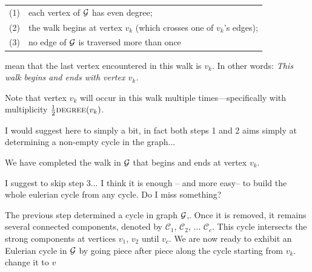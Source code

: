 {\begin{description}
\hspace*{.25in}\begin{tabular}{ll}
(1) & each vertex of $\mbox{$\cal G$}$ has even degree; \\
(2) & the walk begins at vertex $v_k$ (which crosses one of $v_k$'s edges); \\
(3) & no edge of $\mbox{$\cal G$}$ is traversed more than once
\end{tabular}

\noindent
mean that the last vertex encountered in this walk is $v_k$.  In other
words: {\em This walk begins and ends with vertex $v_k$.}



Note that vertex $v_k$ will occur in this walk multiple
times---specifically with multiplicity $\frac{1}{2} \mbox{\sc
  degree}(v_k)$.
  
{\Denis I would suggest here to simply a bit, in fact both  steps 1 and 2 aims simply at determining a non-empty cycle in the graph...}

We have completed the walk in $\mbox{$\cal G$}$ that begins and ends at vertex $v_k$.

{\Denis I suggest to skip step 3... I think it is enough -- and more easy-- to build
the whole eulerian cycle from any cycle. Do I miss something?}


\item[{\bf Step 4}]

The previous step determined a cycle in graph $\mbox{$\cal G$}$,.
Once it is removed, it remains several connected components,
denoted by $\mathcal{C}_1$, $\mathcal{C}_2$, $\ldots$ $\mathcal{C}_c$.
This cycle intersects the strong components at vertices $v_1$, $v_2$ until $v_c$. 
We are now ready to exhibit an Eulerian cycle in $\mbox{$\cal G$}$ by going piece after piece along the cycle 
starting from $v_k$.
{\Denis change it to $v$}


\end{description}}
